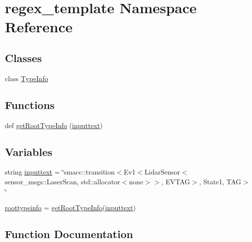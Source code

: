 \hypertarget{namespaceregex__template}{}\section{regex\+\_\+template Namespace Reference}
\label{namespaceregex__template}
\subsection*{Classes}
\begin{DoxyCompactItemize}
\item 
class \hyperlink{classregex__template_1_1TypeInfo}{Type\+Info}
\end{DoxyCompactItemize}
\subsection*{Functions}
\begin{DoxyCompactItemize}
\item 
def \hyperlink{namespaceregex__template_a13dc0843d7416b24f99bcffd147c3d79}{get\+Root\+Type\+Info} (\hyperlink{namespaceregex__template_a5e23ed7a5dae7db8eb3cdae8fb3e3230}{inputtext})
\end{DoxyCompactItemize}
\subsection*{Variables}
\begin{DoxyCompactItemize}
\item 
string \hyperlink{namespaceregex__template_a5e23ed7a5dae7db8eb3cdae8fb3e3230}{inputtext} = \char`\"{}smacc\+::transition$<$Ev1$<$Lidar\+Sensor$<$sensor\+\_\+msgs\+::\+Laser\+Scan, std\+::allocator$<$none$>$$>$, E\+V\+T\+AG$>$, State1, T\+AG$>$\char`\"{}
\item 
\hyperlink{namespaceregex__template_a0b583a61fb8c99797bfa366fda2f86a2}{roottypeinfo} = \hyperlink{namespaceregex__template_a13dc0843d7416b24f99bcffd147c3d79}{get\+Root\+Type\+Info}(\hyperlink{namespaceregex__template_a5e23ed7a5dae7db8eb3cdae8fb3e3230}{inputtext})
\end{DoxyCompactItemize}


\subsection{Function Documentation}
